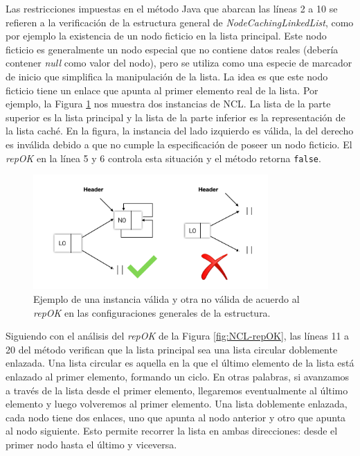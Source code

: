 Las restricciones impuestas en el método Java que abarcan las líneas 2 a 10 se refieren a la verificación de la estructura general de \emph{NodeCachingLinkedList},
como por ejemplo la existencia de un nodo ficticio en la lista principal. 
Este nodo ficticio es generalmente un nodo especial que no contiene datos reales
(debería contener \emph{null} como valor del nodo), pero se utiliza como una
especie de marcador de inicio que simplifica la manipulación de la lista. La
idea es que este nodo ficticio tiene un enlace que apunta al primer elemento
real de la lista. Por ejemplo, la Figura \ref{fig:repOK1}  
nos muestra dos instancias de NCL. La lista de la parte superior es la lista principal y la lista de la parte inferior es la representación de la lista caché. 
En la figura, la instancia del lado izquierdo es válida, la del derecho es inválida debido a que no cumple la especificación de poseer un nodo ficticio. 
El \emph{repOK} en la línea 5 y 6 controla esta situación y el método retorna \texttt{false}.

\begin{figure}[H]
  \centering
  \includegraphics[width=0.8\textwidth]{images/repok1.jpg}
  \caption{Ejemplo de una instancia válida y otra no válida de acuerdo al \emph{repOK} en las configuraciones generales de la estructura.}
  \label{fig:repOK1}
\end{figure}

Siguiendo con el análisis del \emph{repOK} de la Figura \ref{fig:NCL-repOK}, las líneas 11 a 20 del método verifican que la lista principal 
sea una lista circular doblemente enlazada. Una lista circular es aquella en la que el último elemento de la lista está enlazado al primer elemento, formando un ciclo. 
En otras palabras, si avanzamos a través de la lista desde el primer elemento, llegaremos eventualmente al último elemento y luego volveremos al primer elemento.
Una lista doblemente enlazada, cada nodo tiene dos enlaces, uno que apunta al nodo anterior y otro que apunta al nodo siguiente. 
Esto permite recorrer la lista en ambas direcciones: desde el primer nodo hasta el último y viceversa.

